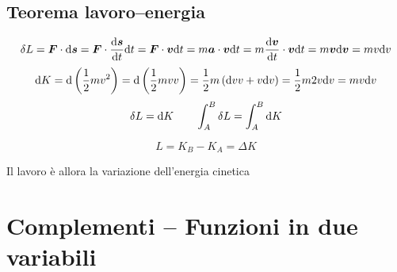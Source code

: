 \subsection{Teorema lavoro--energia}
\begin{equation*}\delta L=\boldsymbol{F}\cdot\mathrm{d} \boldsymbol{s}=\boldsymbol{F}\cdot\frac{\mathrm{d} \boldsymbol{s}}{\mathrm{d} t}\mathrm{d} t=\boldsymbol{F}\cdot\boldsymbol{v}\mathrm{d} t=m\boldsymbol{a}\cdot\boldsymbol{v}\mathrm{d} t=m\frac{\mathrm{d} \boldsymbol{v}}{\mathrm{d} t}\cdot\boldsymbol{v}\mathrm{d} t=m\boldsymbol{v}\mathrm{d} \boldsymbol{v}=mv\mathrm{d} v\end{equation*}
\begin{equation*}\mathrm{d} K=\mathrm{d} \left(\frac{1}{2}mv^2\right)=\mathrm{d} \left(\frac{1}{2}mvv\right)=\frac{1}{2}m\left(\mathrm{d} vv+v\mathrm{d} v\right)=\frac{1}{2}m2v\mathrm{d} v=mv\mathrm{d} v\end{equation*}
\begin{equation*}\delta L=\mathrm{d} K\qquad\int_A^B\delta L=\int_A^B \mathrm{d} K\end{equation*}
\begin{Teo}
\begin{equation*}L=K_B-K_A=\Delta K\end{equation*}
\end{Teo}
Il lavoro è allora la variazione dell'energia cinetica


\section{Complementi -- Funzioni in due variabili}

